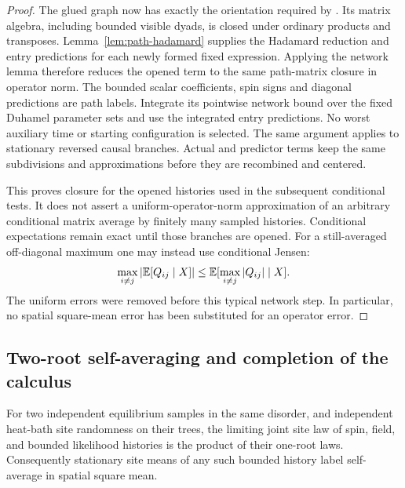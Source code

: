 \begin{proof}
The glued graph now has exactly the orientation required by
.  Its matrix algebra, including
bounded visible dyads, is closed under ordinary products and
transposes.  Lemma~\ref{lem:path-hadamard} supplies the Hadamard
reduction and entry predictions for each newly formed fixed
expression.  Applying the network lemma therefore reduces the
opened term to the same path-matrix closure in operator norm.  The bounded scalar coefficients,
spin signs and diagonal predictions are path labels.  Integrate its
pointwise network bound over the fixed Duhamel parameter sets and
use the integrated entry predictions.  No worst auxiliary time or
starting configuration is selected.  The same argument applies to
stationary reversed causal branches.  Actual and predictor terms
keep the same subdivisions and approximations before they are
recombined and centered.

This proves closure for the opened histories used in the subsequent
conditional tests.  It does not assert a uniform-operator-norm
approximation of an arbitrary conditional matrix average by finitely
many sampled histories.  Conditional expectations remain exact
until those branches are opened.  For a still-averaged off-diagonal
maximum one may instead use conditional Jensen:
\[
 \max_{i\ne j}|\mathbb E[Q_{ij}\mid X]|
 \le\mathbb E[\max_{i\ne j}|Q_{ij}|\mid X].
\]
The uniform errors were removed before this typical network step.
In particular, no spatial square-mean error has been substituted for
an operator error.
\end{proof}

\subsection{Two-root self-averaging and completion of the calculus}

\begin{lemma}
\label{lem:path-two-root}
For two independent equilibrium samples in the same disorder, and
independent heat-bath site randomness on their trees, the limiting
joint site law of spin, field, and bounded likelihood histories is
the product of their one-root laws.  Consequently stationary site
means of any such bounded history label self-average in spatial
square mean.
\end{lemma}

